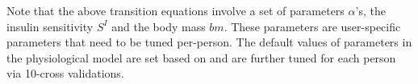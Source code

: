 
Note that the above transition equations involve a set of parameters $\alpha$'s, \eg the insulin sensitivity $S^I$ and the body mass $bm$.
These parameters are user-specific parameters that need to be tuned per-person.
The default values of parameters in the physiological model are set based on \cite{bib:duke2010intelligent} and are further tuned for each person via 10-cross validations.

